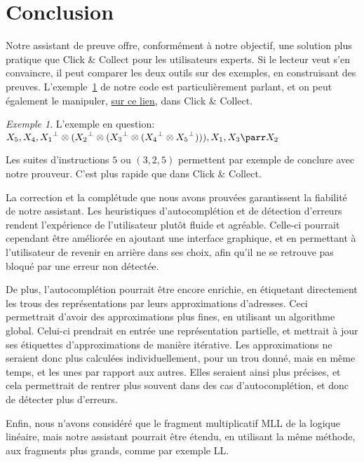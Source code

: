 \documentclass[11pt,a4paper]{article}
\theoremstyle{plain}
\theoremstyle{definition}
\theoremstyle{remark}
\newtheorem{example}{Exemple}
\newcommand*{\orth}{^\perp}
\newcommand*{\tensor}{\otimes}
\begin{document}
\section{Conclusion}

Notre assistant de preuve offre, conformément à notre objectif, une solution plus pratique que Click \& Collect pour les utilisateurs experts. Si le lecteur veut s'en convaincre, il peut comparer les deux outils sur des exemples, en construisant des preuves. L'exemple~\ref{exconcl} de notre code est particulièrement parlant, et on peut également le manipuler, \href{https://click-and-collect.linear-logic.org/?s=X5%2C+X4%2C+X1%5E+*+%28X2%5E+*+%28X3%5E+*+%28X4%5E+*+X5%5E%29%29%29%2C+X1%2C+X3+%7C+X2}{sur ce lien}, dans Click \& Collect.

\begin{example}\label{exconcl}
    L'exemple en question:
%
    $X_5, X_4, {X_1}\orth \tensor ({X_2}\orth \tensor ({X_3}\orth \tensor ({X_4}\orth \tensor {X_5}\orth))), X_1, X_3 \parr X_2$

    Les suites d'instructions $5$ ou $(3, 2, 5)$ permettent par exemple de conclure avec notre prouveur. C'est plus rapide que dans Click \& Collect.
\end{example}

La correction et la complétude que nous avons prouvées garantissent la fiabilité de notre assistant. Les heuristiques d'autocomplétion et de détection d'erreurs rendent l'expérience de l'utilisateur plutôt fluide et agréable. Celle-ci pourrait cependant être améliorée en ajoutant une interface graphique, et en permettant à l'utilisateur de revenir en arrière dans ses choix, afin qu'il ne se retrouve pas bloqué par une erreur non détectée.

De plus, l'autocomplétion pourrait être encore enrichie, en étiquetant directement les trous des représentations par leurs approximations d'adresses. Ceci permettrait d'avoir des approximations plus fines, en utilisant un algorithme global. Celui-ci prendrait en entrée une représentation partielle, et mettrait à jour ses étiquettes d'approximations de manière itérative. Les approximations ne seraient donc plus calculées individuellement, pour un trou donné, mais en même temps, et les unes par rapport aux autres. Elles seraient ainsi plus précises, et cela permettrait de rentrer plus souvent dans des cas d'autocomplétion, et donc de détecter plus d'erreurs.

Enfin, nous n'avons considéré que le fragment multiplicatif MLL de la logique linéaire, mais notre assistant pourrait être étendu, en utilisant la même méthode, aux fragments plus grands, comme par exemple LL.
\end{document}
